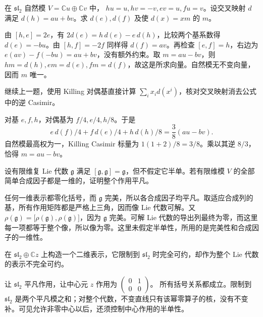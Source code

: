 \begin{exercise}\label{b5:ex:18-crossed-map-sl2}
	在 \(\mathfrak{sl}_2\) 自然模 \(V=\mathbb Cu\oplus\mathbb Cv\) 中， \(hu=u,hv=-v,ev=u,fu=v\)。设交叉映射 \(d\) 满足 \(d(h)=au+bv\)。求 \(d(e),d(f)\) 及使 \(d(x)=xm\) 的 \(m\)。
\end{exercise}
\begin{solution}
	由 \([h,e]=2e\)，有 \(2d(e)=h\,d(e)-e\,d(h)\)，比较两个基系数得 \(d(e)=-bu\)。由 \([h,f]=-2f\) 同样得 \(d(f)=av\)。再检查 \([e,f]=h\)，右边为 \(e(av)-f(-bu)=au+bv\)，没有额外约束。取 \(m=au-bv\)，则 \(hm=d(h),em=d(e),fm=d(f)\)，故这是所求向量。自然模无不变向量，因而 \(m\) 唯一。
\end{solution}

\begin{exercise}\label{b5:ex:18-casimir-crossed-formula}
	继续上一题，使用 Killing 对偶基直接计算 \(\sum_i x_i d(x^i)\)，核对交叉映射消去公式中的逆 Casimir。
\end{exercise}
\begin{solution}
	对基 \(e,f,h\)，对偶基为 \(f/4,e/4,h/8\)。于是
	\[
		e\,d(f)/4+f\,d(e)/4+h\,d(h)/8 =\frac38(au-bv).
	\]
	自然模最高权为一，Killing Casimir 标量为 \(1(1+2)/8=3/8\)。乘以其逆 \(8/3\)，恰得 \(m=au-bv\)。
\end{solution}

\begin{exercise}\label{b5:ex:18-trivial-composition-factors}
	设有限维复 Lie 代数 \(\mathfrak g\) 满足 \([\mathfrak g,\mathfrak g]=\mathfrak g\)，但不假定它半单。若有限维模 \(V\) 的全部简单合成因子都是一维的，证明整个作用平凡。
\end{exercise}
\begin{solution}
	任何一维表示都零化括号，而 \(\mathfrak g\) 完美，所以各合成因子均平凡。取适应合成列的基，所有作用矩阵都是严格上三角，因而像 Lie 代数可解。又 \(\rho(\mathfrak g)=\bigl[\rho(\mathfrak g),\rho(\mathfrak g)\bigr]\)，因为 \(\mathfrak g\) 完美。可解 Lie 代数的导出列最终为零，而这里每一项都等于整个像，所以像为零。这里未假定半单性，所用的是完美性和合成因子的一维性。
\end{solution}

\begin{exercise}\label{b5:ex:18-reductive-counterexample}
	在 \(\mathfrak{sl}_2\oplus\mathbb Cz\) 上构造一个二维表示，它限制到 \(\mathfrak{sl}_2\) 时完全可约，却作为整个 Lie 代数的表示不完全可约。
\end{exercise}
\begin{solution}
	让 \(\mathfrak{sl}_2\) 平凡作用，让中心元 \(z\) 作用为
	\(\begin{pmatrix}0&1\\0&0\end{pmatrix}\)。
	所有括号关系都成立。限制到 \(\mathfrak{sl}_2\) 是两个平凡模之和；对整个代数，不变直线只有该幂零算子的核，没有不变补。可见允许非零中心以后，还须控制中心作用的半单性。
\end{solution}

